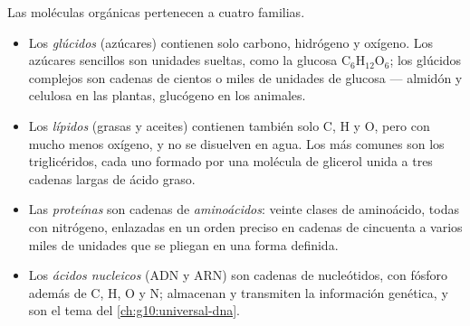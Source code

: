 \begin{definition}\label{def:g10:chemistry-of-life:families}
Las moléculas orgánicas pertenecen a cuatro familias.
\begin{itemize}
  \item Los \emph{glúcidos} (azúcares) contienen solo
        carbono, hidrógeno y oxígeno. Los azúcares sencillos son
        unidades sueltas, como la glucosa $\mathrm{C_6H_{12}O_6}$; los
        glúcidos complejos son cadenas de cientos o miles de unidades
        de glucosa --- almidón y celulosa en las plantas, glucógeno en
        los animales.
  \item Los \emph{lípidos} (grasas y aceites) contienen
        también solo C, H y O, pero con mucho menos oxígeno, y no se
        disuelven en agua. Los más comunes son los triglicéridos, cada
        uno formado por una molécula de glicerol unida a tres cadenas
        largas de ácido graso.
  \item Las \emph{proteínas} son cadenas de
        \emph{aminoácidos}: veinte clases de
        aminoácido, todas con nitrógeno, enlazadas en un orden preciso
        en cadenas de cincuenta a varios miles de unidades que se
        pliegan en una forma definida.
  \item Los \emph{ácidos nucleicos} (ADN y ARN)
        son cadenas de nucleótidos, con fósforo además de C, H, O y N;
        almacenan y transmiten la información genética, y son el tema
        del \cref{ch:g10:universal-dna}.
\end{itemize}
\end{definition}

